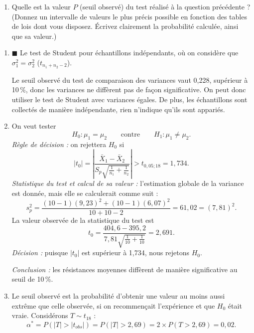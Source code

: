 \begin{exercice}
\begin{enumerate}[label=(\alph*)]
  \emph{Raccourcis de calculs selon le type d'analyse que vous avez choisi :}
  \begin{itemize}
    \item Données appariées : utilisez la variance $s^2_D=9,51^2$
    \item Test de Student : utilisez la variance $s^2_p=7,81^2$
    \item Test de Welch : utilisez les degrés de liberté $v=16$
  \end{itemize}
  \item Quelle est la valeur $P$ (seuil observé) du test réalisé à la question précédente ?
  (Donnez un intervalle de valeurs le plus précis possible en fonction des tables de lois
  dont vous disposez. Écrivez clairement la probabilité calculée, ainsi que sa valeur.)
\end{enumerate}
\begin{solution}
\begin{enumerate}[label=(\alph*)]
  \item $\blacksquare$ Le test de Student pour échantillons indépendants, où on considère
  que $\sigma^2_1=\sigma^2_2$ ($t_{n_1+n_2-2}$).

  Le seuil observé du test de comparaison des variances vaut 0,228, supérieur à 10\,\%,
  donc les variances ne diffèrent pas de façon significative. On peut donc utiliser le test
  de Student avec variances égales. De plus, les échantillons sont collectés de manière
  indépendante, rien n'indique qu'ils sont appariés.
  \item On veut tester
  \[
    H_0:\mu_1=\mu_2\qquad\text{contre}\qquad H_1:\mu_1\neq\mu_2.
  \]
  \emph{Règle de décision :} on rejettera $H_0$ si
  \[
    |t_0|=\left|\frac{\bar X_1-\bar X_2}{S_p\sqrt{\frac{1}{n_1}+\frac{1}{n_2}}}\right|
    >t_{0,05;18}=1,734.
  \]
  \emph{Statistique du test et calcul de sa valeur :} l'estimation globale de la variance
  est donnée, mais elle se calculerait comme suit :
  \[
    s^2_p=\frac{(10-1)(9,23)^2+(10-1)(6,07)^2}{10+10-2}=61,02=(7,81)^2.
  \]
  La valeur observée de la statistique du test est
  \[
    t_0=\frac{404,6-395,2}{7,81\sqrt{\frac{1}{10}+\frac{1}{10}}}=2,691.
  \]
  \emph{Décision :} puisque $|t_0|$ est supérieur à 1,734, nous rejetons $H_0$.

  \emph{Conclusion :} les résistances moyennes diffèrent de manière significative au seuil
  de 10\,\%.
  \item Le seuil observé est la probabilité d'obtenir une valeur au moins aussi extrême que
  celle observée, si on recommençait l'expérience et que $H_0$ était vraie. Considérons
  $T\sim t_{18}$ :
  \[
    \alpha^*=P(|T|>|t_{obs}|)=P(|T|>2,69)=2\times P(T>2,69)=0,02.
  \]
\end{enumerate}
\end{solution}
\end{exercice}

